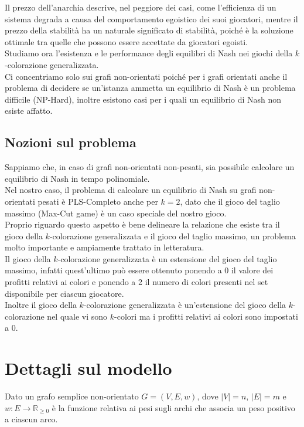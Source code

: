 Il prezzo dell'anarchia descrive, nel peggiore dei casi, come l'efficienza di un sistema degrada a causa del comportamento egoistico dei suoi giocatori, mentre il prezzo della stabilità ha un naturale significato di stabilità, poiché è la soluzione ottimale tra quelle che possono essere accettate da giocatori egoisti.\\

Studiamo ora l'esistenza e le performance degli equilibri di Nash nei giochi della \(k\)-colorazione generalizzata.\\

Ci concentriamo solo sui grafi non-orientati poiché per i grafi orientati anche il problema di decidere se un'istanza ammetta un equilibrio di Nash è un problema difficile (NP-Hard), inoltre esistono casi per i quali un equilibrio di Nash non esiste affatto.\\

\subsection{Nozioni sul problema}
\justify
Sappiamo che, in caso di grafi non-orientati non-pesati, sia possibile calcolare un equilibrio di Nash in tempo polinomiale.\\

Nel nostro caso, il problema di calcolare un equilibrio di Nash su grafi non-orientati pesati è PLS-Completo anche per \(k = 2\), dato che il gioco del taglio massimo (Max-Cut game) è un caso speciale del nostro gioco.\\

Proprio riguardo questo aspetto è bene delineare la relazione che esiste tra il gioco della \(k\)-colorazione generalizzata e il gioco del taglio massimo, un problema molto importante e ampiamente trattato in letteratura.\\

Il gioco della \(k\)-colorazione generalizzata è un estensione del gioco del taglio massimo, infatti quest'ultimo può essere ottenuto ponendo a 0 il valore dei profitti relativi ai colori e ponendo a 2 il numero di colori presenti nel set disponibile per ciascun giocatore.\\

Inoltre il gioco della \(k\)-colorazione generalizzata è un'estensione del gioco della \(k\)-colorazione nel quale vi sono \(k\)-colori ma i profitti relativi ai colori sono impostati a 0.\\

\section{Dettagli sul modello}
\justify
Dato un grafo semplice non-orientato \(G = (V, E, w)\), dove \(|V| = n\), \(|E| = m\) e \(w : E\rightarrow\mathds{R}_{\geq 0}\) è la funzione relativa ai pesi sugli archi che associa un peso positivo a ciascun arco.\\

